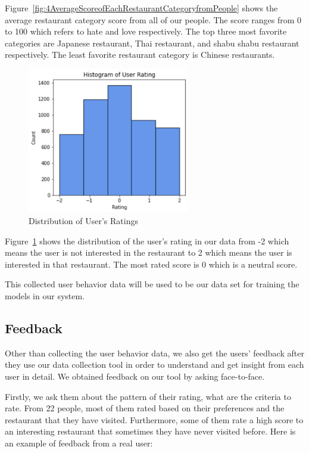 \documentclass[12pt,oneside,openright,a4paper]{cpe-english-project}
\begin{document}
Figure~\ref{fig:4AverageScoreofEachRestaurantCategoryfromPeople} shows the average restaurant category score from all of our people. The score ranges from 0 to 100 which refers to hate and love respectively. The top three most favorite categories are Japanese restaurant, Thai restaurant, and shabu shabu restaurant respectively. The least favorite restaurant category is Chinese restaurants.

\begin{figure}[H]\centering
\includegraphics[width=200pt]{./images/4DistributionofUsersRatings.png}
\caption{Distribution of User’s Ratings}\label{fig:4DistributionofUsersRatings}
\end{figure}\vspace{-24pt}

Figure~\ref{fig:4DistributionofUsersRatings} shows the distribution of the user’s rating in our data from -2 which means the user is not interested in the restaurant to 2 which means the user is interested in that restaurant. The most rated score is 0 which is a neutral score.

This collected user behavior data will be used to be our data set for training the models in our system.


\subsection{Feedback}

Other than collecting the user behavior data, we also get the users’ feedback after they use our data collection tool in order to understand and get insight from each user in detail. We obtained feedback on our tool by asking face-to-face.

Firstly, we ask them about the pattern of their rating, what are the criteria to rate. From 22 people, most of them rated based on their preferences and the restaurant that they have visited. Furthermore, some of them rate a high score to an interesting restaurant that sometimes they have never visited before. Here is an example of feedback from a real user:
\end{document}
